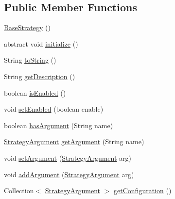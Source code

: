 \subsection*{Public Member Functions}
\begin{DoxyCompactItemize}
\item 
\hyperlink{classch_1_1zhaw_1_1ba10__bsha__1_1_1strategies_1_1BaseStrategy_a22dc9cd6d939460308ad8d065e4ec646}{BaseStrategy} ()
\item 
abstract void \hyperlink{classch_1_1zhaw_1_1ba10__bsha__1_1_1strategies_1_1BaseStrategy_af6ea27835befac71906915236a347450}{initialize} ()
\item 
String \hyperlink{classch_1_1zhaw_1_1ba10__bsha__1_1_1strategies_1_1BaseStrategy_adfb24fbd69261e8567269c5d59365e46}{toString} ()
\item 
String \hyperlink{classch_1_1zhaw_1_1ba10__bsha__1_1_1strategies_1_1BaseStrategy_a56e779e4ce93ac1570b34bcde23e7455}{getDescription} ()
\item 
boolean \hyperlink{classch_1_1zhaw_1_1ba10__bsha__1_1_1strategies_1_1BaseStrategy_ad8e0e57f59a0ca49b27f205a39f2b8ae}{isEnabled} ()
\item 
void \hyperlink{classch_1_1zhaw_1_1ba10__bsha__1_1_1strategies_1_1BaseStrategy_acfeb454c9eda3e3279c75ce8101d980c}{setEnabled} (boolean enable)
\item 
boolean \hyperlink{classch_1_1zhaw_1_1ba10__bsha__1_1_1strategies_1_1BaseStrategy_a468d38d65e49d18ced35a34962e3f667}{hasArgument} (String name)
\item 
\hyperlink{classch_1_1zhaw_1_1ba10__bsha__1_1_1StrategyArgument}{StrategyArgument} \hyperlink{classch_1_1zhaw_1_1ba10__bsha__1_1_1strategies_1_1BaseStrategy_a8c113a7ead0de41b8dbd5e58d66de08e}{getArgument} (String name)
\item 
void \hyperlink{classch_1_1zhaw_1_1ba10__bsha__1_1_1strategies_1_1BaseStrategy_ad1b20c8f3f41126c9e6cef52d3f30bbe}{setArgument} (\hyperlink{classch_1_1zhaw_1_1ba10__bsha__1_1_1StrategyArgument}{StrategyArgument} arg)
\item 
void \hyperlink{classch_1_1zhaw_1_1ba10__bsha__1_1_1strategies_1_1BaseStrategy_ad106d9d501550fe475a4a01032632597}{addArgument} (\hyperlink{classch_1_1zhaw_1_1ba10__bsha__1_1_1StrategyArgument}{StrategyArgument} arg)
\item 
Collection$<$ \hyperlink{classch_1_1zhaw_1_1ba10__bsha__1_1_1StrategyArgument}{StrategyArgument} $>$ \hyperlink{classch_1_1zhaw_1_1ba10__bsha__1_1_1strategies_1_1BaseStrategy_a38329740106081e084162fb2e2c25f07}{getConfiguration} ()
\end{DoxyCompactItemize}
